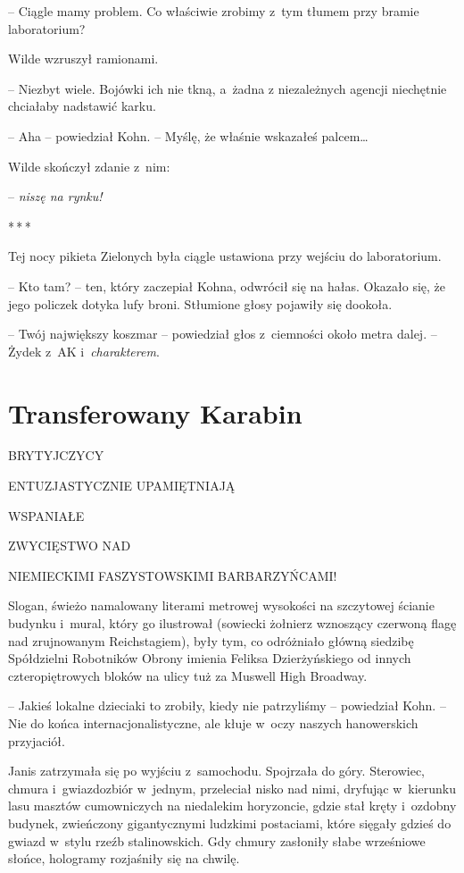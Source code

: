 \documentclass[oneside,polish,11pt,sfheadings]{mwbk}
\newcommand{\threeast}{\bigskip\par\centerline{*\,*\,*}\medskip\par}%
\begin{document}
-- Ciągle mamy problem. Co
właściwie zrobimy z~tym tłumem przy bramie laboratorium?

Wilde wzruszył ramionami. 

-- Niezbyt wiele. Bojówki ich nie tkną, a~żadna
z niezależnych agencji niechętnie chciałaby nadstawić karku.

-- Aha -- powiedział Kohn. -- Myślę, że właśnie wskazałeś palcem\ldots

Wilde skończył zdanie z~nim: 

-- \emph{niszę na rynku!}
  \threeast 

Tej nocy pikieta Zielonych była ciągle ustawiona przy wejściu do
laboratorium.

-- Kto tam? -- ten, który zaczepiał Kohna, odwrócił się na hałas. Okazało
się, że jego policzek dotyka lufy broni. Stłumione głosy pojawiły się
dookoła.

-- Twój największy koszmar -- powiedział głos z~ciemności około metra
dalej. -- Żydek z~AK i~\emph{charakterem}.


\chapter{Transferowany Karabin}

BRYTYJCZYCY

ENTUZJASTYCZNIE UPAMIĘTNIAJĄ

WSPANIAŁE

ZWYCIĘSTWO NAD

NIEMIECKIMI FASZYSTOWSKIMI BARBARZYŃCAMI!


Slogan, świeżo namalowany literami metrowej wysokości na szczytowej
ścianie budynku i~mural, który go ilustrował (sowiecki żołnierz
wznoszący czerwoną flagę nad zrujnowanym Reichstagiem), były tym, co
odróżniało główną siedzibę Spółdzielni Robotników Obrony imienia Feliksa
Dzierżyńskiego od innych czteropiętrowych bloków na ulicy tuż za Muswell
High Broadway.

-- Jakieś lokalne dzieciaki to zrobiły, kiedy nie patrzyliśmy -- powiedział Kohn. -- Nie do końca internacjonalistyczne, ale kłuje w~oczy
naszych hanowerskich przyjaciół.

Janis zatrzymała się po wyjściu z~samochodu. Spojrzała do góry.
Sterowiec, chmura i~gwiazdozbiór w~jednym, przeleciał nisko nad nimi,
dryfując w~kierunku lasu masztów cumowniczych na niedalekim horyzoncie,
gdzie stał kręty i~ozdobny budynek, zwieńczony gigantycznymi ludzkimi
postaciami, które sięgały gdzieś do gwiazd w~stylu rzeźb stalinowskich.
Gdy chmury zasłoniły słabe wrześniowe słońce, hologramy rozjaśniły się
na chwilę.
\end{document}

